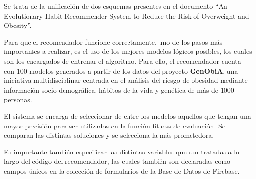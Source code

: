 Se trata de la unificación de dos esquemas presentes en el documento ``An Evolutionary Habit Recommender System to
Reduce the Risk of Overweight and Obesity''.


Para que el recomendador funcione correctamente, uno de los pasos más importantes a realizar, es el uso de los mejores modelos lógicos posibles, los cuales son los encargados de entrenar el algoritmo.
Para ello, el recomendador cuenta con 100 modelos generados a partir de los datos del proyecto \textbf{GenObiA}, una iniciativa multidisciplinar centrada en el análisis del riesgo de obesidad mediante información socio-demográfica, hábitos de la vida y genética de más de 1000 personas.

El sistema se encarga de seleccionar de entre los modelos aquellos que tengan una mayor precisión para ser utilizados en la función fitness de evaluación. Se comparan las distintas soluciones y se selecciona la más prometedora.

Es importante también especificar las distintas variables que son tratadas a lo largo del código del recomendador, las cuales también son declaradas como campos únicos en la colección de formularios de la Base de Datos de Firebase.

